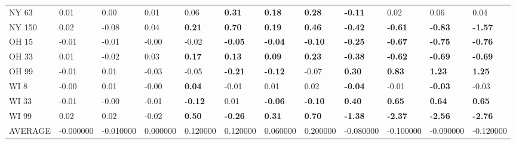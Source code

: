 \begin{tabular}{llllllllllll}
NY 63 & 0.01 & 0.00 & 0.01 & 0.06 & \textbf{0.31} & \textbf{0.18} & \textbf{0.28} & \textbf{-0.11} & 0.02 & 0.06 & 0.04 \\
NY 150 & 0.02 & -0.08 & 0.04 & \textbf{0.21} & \textbf{0.70} & \textbf{0.19} & \textbf{0.46} & \textbf{-0.42} & \textbf{-0.61} & \textbf{-0.83} & \textbf{-1.57} \\
OH 15 & -0.01 & -0.01 & -0.00 & -0.02 & \textbf{-0.05} & \textbf{-0.04} & \textbf{-0.10} & \textbf{-0.25} & \textbf{-0.67} & \textbf{-0.75} & \textbf{-0.76} \\
OH 33 & 0.01 & -0.02 & 0.03 & \textbf{0.17} & \textbf{0.13} & \textbf{0.09} & \textbf{0.23} & \textbf{-0.38} & \textbf{-0.62} & \textbf{-0.69} & \textbf{-0.69} \\
OH 99 & -0.01 & 0.01 & -0.03 & -0.05 & \textbf{-0.21} & \textbf{-0.12} & -0.07 & \textbf{0.30} & \textbf{0.83} & \textbf{1.23} & \textbf{1.25} \\
WI 8 & -0.00 & 0.01 & -0.00 & \textbf{0.04} & -0.01 & 0.01 & 0.02 & \textbf{-0.04} & -0.01 & \textbf{-0.03} & -0.03 \\
WI 33 & -0.01 & -0.00 & -0.01 & \textbf{-0.12} & 0.01 & \textbf{-0.06} & \textbf{-0.10} & \textbf{0.40} & \textbf{0.65} & \textbf{0.64} & \textbf{0.65} \\
WI 99 & 0.02 & 0.02 & -0.02 & \textbf{0.50} & \textbf{-0.26} & \textbf{0.31} & \textbf{0.70} & \textbf{-1.38} & \textbf{-2.37} & \textbf{-2.56} & \textbf{-2.76} \\
AVERAGE & -0.000000 & -0.010000 & 0.000000 & 0.120000 & 0.120000 & 0.060000 & 0.200000 & -0.080000 & -0.100000 & -0.090000 & -0.120000 \\
\bottomrule
\end{tabular}
